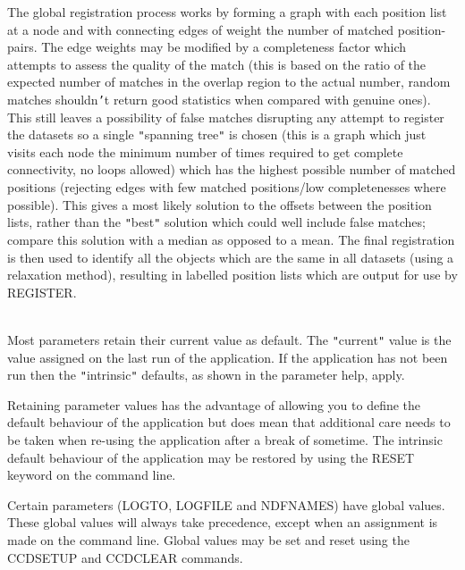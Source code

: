 \documentclass[twoside,11pt]{article}
\newcommand{\htmlref}[2]{#1}
\renewcommand{\_}{\texttt{\symbol{95}}}
\newcommand{\qt}[1]{{\tt "}#1{\tt "}}
\newcommand{\xroutine}[1]{\htmlref{{\sc #1}}{#1}}
\newcommand{\sstdiytopic}[2]{\item[#1:] \mbox{} \\[1.3ex] #2}
\newcommand{\sstdiytopic}[2]{\item[{#1}] #2 }
\begin{document}
{{      The global registration process works by forming a graph with
      each position list at a node and with connecting edges of weight
      the number of matched position-pairs. The edge weights may be
      modified by a completeness factor which attempts to assess the
      quality of the match (this is based on the ratio of the expected
      number of matches in the overlap region to the actual number,
      random matches shouldn{\tt '}t return good statistics when compared
      with genuine ones). This still leaves a possibility of false
      matches disrupting any attempt to register the datasets so a
      single {\tt "}spanning tree{\tt "} is chosen (this is a graph which just
      visits each node the minimum number of times required to get
      complete connectivity, no loops allowed) which has the highest
      possible number of matched positions (rejecting edges with few
      matched positions/low completenesses where possible). This gives
      a most likely solution to the offsets between the position lists,
      rather than the {\tt "}best{\tt "} solution which could well include false
      matches; compare this solution with a median as opposed to a
      mean. The final registration is then used to identify all the
      objects which are the same in all datasets (using a relaxation
      method), resulting in labelled position lists which are output
      for use by \xroutine{REGISTER}.
   }
   \sstdiytopic{
      Behaviour of parameters
   } {
      Most parameters retain their current value as default. The
      \qt{current} value is the value assigned on the last run of the
      application. If the application has not been run then the
      \qt{intrinsic} defaults, as shown in the parameter help, apply.

      Retaining parameter values has the advantage of allowing you to
      define the default behaviour of the application but does mean
      that additional care needs to be taken when re-using the
      application after a break of sometime. The intrinsic default
      behaviour of the application may be restored by using the RESET
      keyword on the command line.

      Certain parameters (LOGTO, LOGFILE and NDFNAMES) have global
      values. These global values will always take precedence, except
      when an assignment is made on the command line.  Global values may
      be set and reset using the \xroutine{CCDSETUP} and \xroutine{CCDCLEAR} commands.
   }
}
\end{document}
